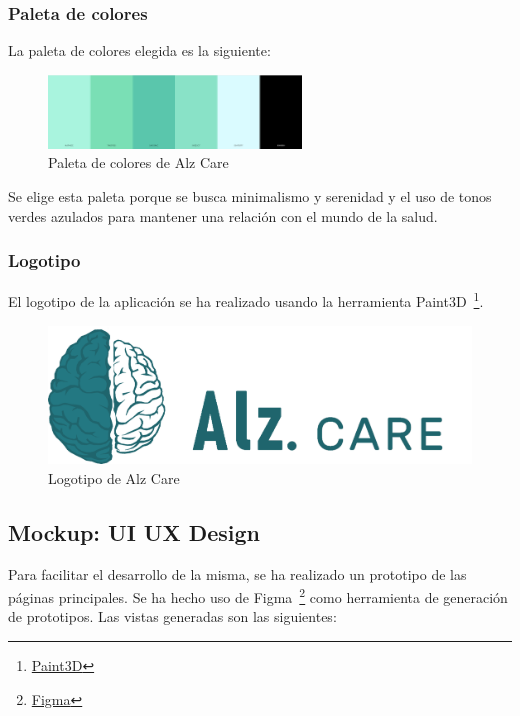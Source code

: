 \subsubsection{Paleta de colores}

La paleta de colores elegida es la siguiente:

\begin{figure}[H]
    \centering
    \includegraphics[width=0.6\textwidth]{./imgs/app/paleta}
    \caption{Paleta de colores de Alz Care}
    \label{fig:paleta-colores}
\end{figure}

Se elige esta paleta porque se busca minimalismo y serenidad y el uso de tonos verdes azulados para mantener una
relación con el mundo de la salud.

\subsubsection{Logotipo}

El logotipo de la aplicación se ha realizado usando la herramienta
Paint3D~\footnote{\href{https://apps.microsoft.com/store/detail/paint-3d/9NBLGGH5FV99?hl=es-es&gl=es}{Paint3D}}.

\begin{figure}[H]
    \centering
    \includegraphics[width=\textwidth]{./imgs/app/icon-name}
    \caption{Logotipo de Alz Care}
    \label{fig:logotipo}
\end{figure}

\subsection{Mockup: UI UX Design}\label{subsec:mockup:-ui-ux-design}
Para facilitar el desarrollo de la misma, se ha realizado un prototipo de las páginas principales.
Se ha hecho uso de Figma~\footnote{\href{https://www.figma.com/}{Figma}} como herramienta de generación de prototipos.
Las vistas generadas son las siguientes:


